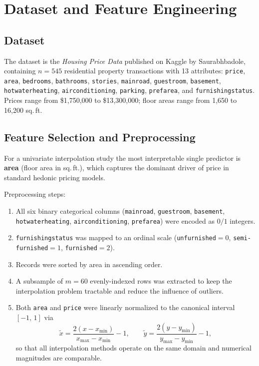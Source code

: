 \documentclass[11pt]{article}
\begin{document}
\section{Dataset and Feature Engineering}

\subsection{Dataset}

The dataset is the \emph{Housing Price Data} published on Kaggle by
Saurabhbadole, containing $n = 545$ residential property transactions with
13 attributes: \texttt{price}, \texttt{area}, \texttt{bedrooms},
\texttt{bathrooms}, \texttt{stories}, \texttt{mainroad}, \texttt{guestroom},
\texttt{basement}, \texttt{hotwaterheating}, \texttt{airconditioning},
\texttt{parking}, \texttt{prefarea}, and \texttt{furnishingstatus}.
Prices range from \$1{,}750{,}000 to \$13{,}300{,}000; floor areas range
from 1{,}650 to 16{,}200 sq.\,ft.

\subsection{Feature Selection and Preprocessing}

For a univariate interpolation study the most interpretable single predictor
is \textbf{area} (floor area in sq.\,ft.), which captures the dominant driver
of price in standard hedonic pricing models.

Preprocessing steps:
\begin{enumerate}
  \item All six binary categorical columns (\texttt{mainroad},
        \texttt{guestroom}, \texttt{basement}, \texttt{hotwaterheating},
        \texttt{airconditioning}, \texttt{prefarea}) were encoded as $0/1$
        integers.
  \item \texttt{furnishingstatus} was mapped to an ordinal scale
        (\texttt{unfurnished}$=0$, \texttt{semi-furnished}$=1$,
        \texttt{furnished}$=2$).
  \item Records were sorted by area in ascending order.
  \item A subsample of $m = 60$ evenly-indexed rows was extracted to keep the
        interpolation problem tractable and reduce the influence of outliers.
  \item Both \texttt{area} and \texttt{price} were linearly normalized to the
        canonical interval $[-1,\,1]$ via
        \[
          \tilde{x} = \frac{2(x - x_{\min})}{x_{\max} - x_{\min}} - 1,
          \qquad
          \tilde{y} = \frac{2(y - y_{\min})}{y_{\max} - y_{\min}} - 1,
        \]
        so that all interpolation methods operate on the same domain and
        numerical magnitudes are comparable.
\end{enumerate}
\end{document}
